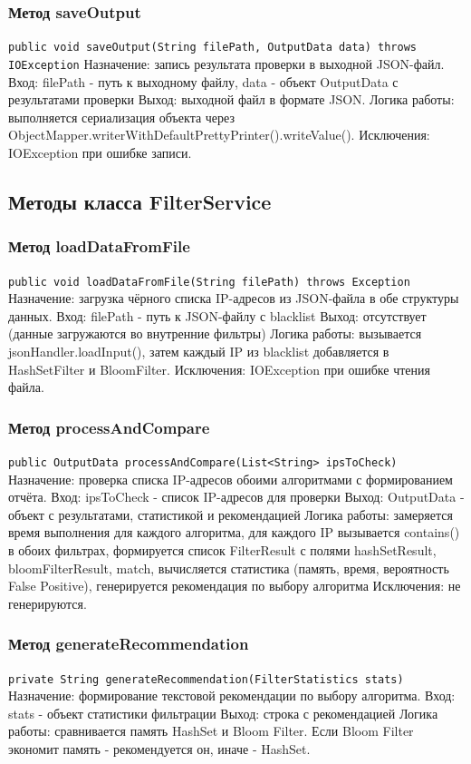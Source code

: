 \subsubsection{Метод saveOutput}
\texttt{public void saveOutput(String filePath, OutputData data) throws IOException}
Назначение: запись результата проверки в выходной JSON-файл.
Вход: filePath - путь к выходному файлу, data - объект OutputData с результатами проверки
Выход: выходной файл в формате JSON.
Логика работы: выполняется сериализация объекта через ObjectMapper.writerWithDefaultPrettyPrinter().writeValue().
Исключения: IOException при ошибке записи.

\subsection{Методы класса FilterService}
\subsubsection{Метод loadDataFromFile}
\texttt{public void loadDataFromFile(String filePath) throws Exception}
Назначение: загрузка чёрного списка IP-адресов из JSON-файла в обе структуры данных.
Вход: filePath - путь к JSON-файлу с blacklist
Выход: отсутствует (данные загружаются во внутренние фильтры)
Логика работы: вызывается jsonHandler.loadInput(), затем каждый IP из blacklist добавляется в HashSetFilter и BloomFilter.
Исключения: IOException при ошибке чтения файла.

\subsubsection{Метод processAndCompare}
\texttt{public OutputData processAndCompare(List<String> ipsToCheck)}
Назначение: проверка списка IP-адресов обоими алгоритмами с формированием отчёта.
Вход: ipsToCheck - список IP-адресов для проверки
Выход: OutputData - объект с результатами, статистикой и рекомендацией
Логика работы: замеряется время выполнения для каждого алгоритма, для каждого IP вызывается contains() в обоих фильтрах, формируется список FilterResult с полями hashSetResult, bloomFilterResult, match, вычисляется статистика (память, время, вероятность False Positive), генерируется рекомендация по выбору алгоритма
Исключения: не генерируются.

\subsubsection{Метод generateRecommendation}
\texttt{private String generateRecommendation(FilterStatistics stats)}
Назначение: формирование текстовой рекомендации по выбору алгоритма.
Вход: stats - объект статистики фильтрации
Выход: строка с рекомендацией
Логика работы: сравнивается память HashSet и Bloom Filter. Если Bloom Filter экономит память - рекомендуется он, иначе - HashSet.


